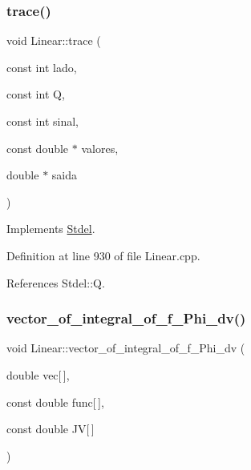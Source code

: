 \subsubsection{\texorpdfstring{trace()}{trace()}}
{\footnotesize\ttfamily void Linear\+::trace (\begin{DoxyParamCaption}\item[{const int}]{lado,  }\item[{const int}]{Q,  }\item[{const int}]{sinal,  }\item[{const double $\ast$}]{valores,  }\item[{double $\ast$}]{saida }\end{DoxyParamCaption})\hspace{0.3cm}{\ttfamily [virtual]}}



Implements \hyperlink{classStdel_aeb2fe03bbd8af61e503e29d3dd5ae4f0}{Stdel}.



Definition at line 930 of file Linear.\+cpp.



References Stdel\+::Q.

\mbox{\label{classLinear_a5068b12a277108b085b000b4ace97d45}} 
\subsubsection{\texorpdfstring{vector\+\_\+of\+\_\+integral\+\_\+of\+\_\+f\+\_\+\+Phi\+\_\+dv()}{vector\_of\_integral\_of\_f\_Phi\_dv()}\hspace{0.1cm}{\footnotesize\ttfamily [1/2]}}
{\footnotesize\ttfamily void Linear\+::vector\+\_\+of\+\_\+integral\+\_\+of\+\_\+f\+\_\+\+Phi\+\_\+dv (\begin{DoxyParamCaption}\item[{double}]{vec\mbox{[}$\,$\mbox{]},  }\item[{const double}]{func\mbox{[}$\,$\mbox{]},  }\item[{const double}]{JV\mbox{[}$\,$\mbox{]} }\end{DoxyParamCaption})\hspace{0.3cm}{\ttfamily [virtual]}}



